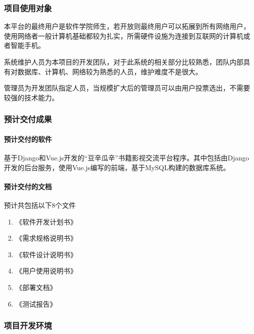 \documentclass[
]{article}
\begin{document}
\hypertarget{header-n239}{%
\subsubsection{项目使用对象}\label{header-n239}}

本平台的最终用户是软件学院师生，若开放则最终用户可以拓展到所有网络用户，使用网络者一般计算机基础都较为扎实，所需硬件设施为连接到互联网的计算机或者智能手机。

系统维护人员为本项目的开发团队，对于此系统的相关部分比较熟悉，团队内部具有对数据库、计算机、网络较为熟悉的人员，维护难度不是很大。

管理员为开发团队指定人员，当规模扩大后的管理员可以由用户投票选出，不需要较强的技术能力。

\hypertarget{header-n243}{%
\subsubsection{预计交付成果}\label{header-n243}}

\hypertarget{header-n244}{%
\paragraph{预计交付的软件}\label{header-n244}}

基于Django和Vue.js开发的``豆辛瓜辛''书籍影视交流平台程序。其中包括由Django开发的后台服务，使用Vue.js编写的前端，基于MySQL构建的数据库系统。

\hypertarget{header-n246}{%
\paragraph{预计交付的文档}\label{header-n246}}

预计共包括以下8个文件

\begin{enumerate}
\def\labelenumi{\arabic{enumi}.}
\item
  《软件开发计划书》
\item
  《需求规格说明书》
\item
  《软件设计说明书》
\item
  《用户使用说明书》
\item
  《部署文档》
\item
  《测试报告》
\end{enumerate}

\hypertarget{header-n261}{%
\subsubsection{项目开发环境}\label{header-n261}}
\end{document}
